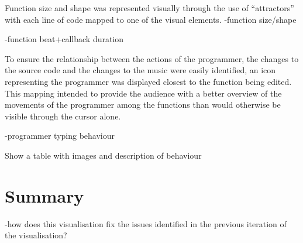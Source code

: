 Function size and shape was represented visually through the use of ``attractors'' with each line of code mapped to one of the visual elements.
-function size/shape

-function beat+callback duration

To ensure the relationship between the actions of the programmer, the changes to the source code and the changes to the music were easily identified, an icon representing the programmer was displayed closest to the function being edited. This mapping intended to provide the audience with a better overview of the movements of the programmer among the functions than would otherwise be visible through the cursor alone.  

-programmer typing behaviour

{\color{red} Show a table with images and description of behaviour}

\section{Summary}

-how does this visualisation fix the issues identified in the previous iteration of the visualisation?

\more


